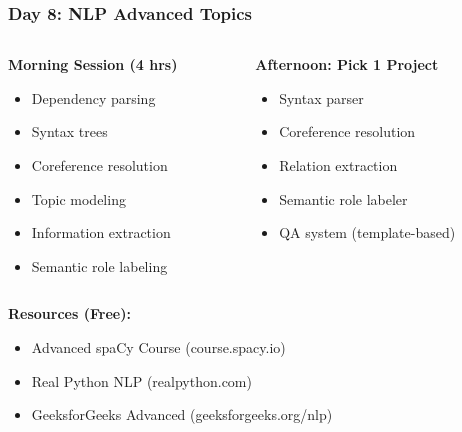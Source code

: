 \begin{frame}[fragile]\frametitle{Day 8: NLP Advanced Topics}
\begin{columns}
    \begin{column}[T]{0.5\linewidth}
      \textbf{Morning Session (4 hrs)}
      \begin{itemize}
        \item Dependency parsing
        \item Syntax trees
        \item Coreference resolution
        \item Topic modeling
        \item Information extraction
        \item Semantic role labeling
      \end{itemize}
    \end{column}
    \begin{column}[T]{0.5\linewidth}
      \textbf{Afternoon: Pick 1 Project}
      \begin{itemize}
        \item Syntax parser
        \item Coreference resolution
        \item Relation extraction
        \item Semantic role labeler
        \item QA system (template-based)
      \end{itemize}
    \end{column}
  \end{columns}
  
  \vspace{0.3cm}
  \textbf{Resources (Free):}
  \begin{itemize}
    \item Advanced spaCy Course (course.spacy.io)
    \item Real Python NLP (realpython.com)
    \item GeeksforGeeks Advanced (geeksforgeeks.org/nlp)
  \end{itemize}
\end{frame}

